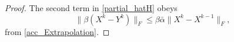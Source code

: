 \documentclass[twoside,11pt]{article}
\numberwithin{equation}{section}
\begin{document}
\begin{proof}
 The second term in \eqref{partial_hatH} obeys 
       \begin{equation}\label{ineq_acc_dxy_APD_APD}
         \|\beta (X^{k}-Y^{k})\|_{F} \le \beta\bar{\alpha}\|X^{k}-X^{k-1}\|_{F},
       \end{equation}
       from \eqref{acc_Extrapolation}. 
 

\end{proof}
\end{document}
